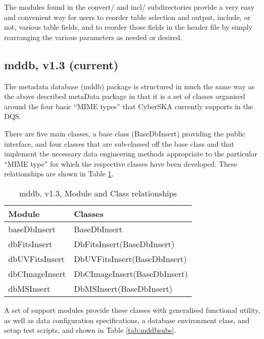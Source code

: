 The modules found in the convert/ and incl/ subdirectories provide a very easy and convenient way for users to reorder table selection and output, include, or not, various table fields, and to reorder those fields in the header file by simply rearranging the various parameters as needed or desired.

\subsection{mddb, v1.3 (current)}
\label{sec:mddb}
The metadata database (mddb) package is structured in much the same way as the above described metaData package in that it is a set of classes organised around the four basic ``MIME types'' that CyberSKA currently supports in the DQS.

There are five main classes, a base class (BaseDbInsert) providing the public interface, and four classes that are sub-classed off the base class and that implement the necessary data engineering methods appropriate to the particular ``MIME type'' for which the respective classes have been developed. These relationships are shown in Table \ref{tab:mddbmods}.

\begin{table}[htbp]
  \centering
  \begin{tabular}{|l|p{8.0cm}|} 
    \hline
    \sc \textbf{Module} & \textbf{Classes} \\
    \hline
    baseDbInsert & BaseDbInsert \\
    dbFitsInsert   & DbFitsInsert(BaseDbInsert) \\
    dbUVFitsInsert& DbUVFitsInsert(BaseDbInsert)\\
    dbCImageInsert& DbCImageInsert(BaseDbInsert)\\
    dbMSInsert & DbMSInsert(BaseDbInsert)\\
    \hline
  \end{tabular}
  \caption{mddb, v1.3, Module and Class relationships}
  \label{tab:mddbmods}
\end{table}

A set of support modules provide these classes with generalised functional utility, as well as data configuration specifications, a database environment class, and setup test scripts, and shown in Table \ref{tab:mddbsubs}.

